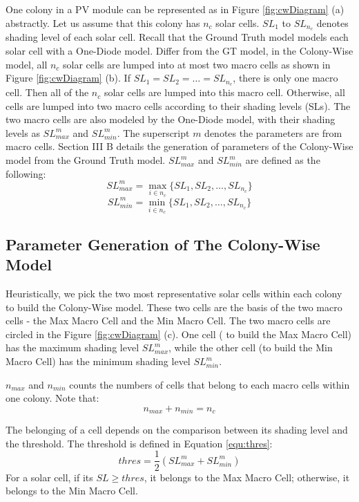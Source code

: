 One colony in a PV module can be represented as in Figure \ref{fig:cwDiagram} (a) abstractly. Let us assume that this colony has $n_c$ solar cells. $SL_1$ to $SL_{n_c}$ denotes shading level of each solar cell. Recall that the Ground Truth model models each solar cell with a One-Diode model. Differ from the GT model, in the Colony-Wise model, all $n_c$ solar cells are lumped into at most two macro cells as shown in Figure \ref{fig:cwDiagram} (b). If $SL_1 = SL_2 = \dots = SL_{n_c}$, there is only one macro cell. Then all of the $n_c$ solar cells are lumped into this macro cell. Otherwise, all cells are lumped into two macro cells according to their shading levels (SLs). The two macro cells are also modeled by the One-Diode model, with their shading levels as $SL_{max}^m$ and $SL_{min}^m$. The superscript $m$ denotes the parameters are from macro cells. Section III B details the generation of parameters of the Colony-Wise model from the Ground Truth model. $SL_{max}^m$ and $SL_{min}^m$ are defined as the following:
\begin{equation}\label{equ:slMax}
  SL_{max}^m = \max_{i \in n_c}{\{SL_1, SL_2,  \dots, SL_{n_c} \}}
\end{equation}
\begin{equation}\label{equ:slMin}
  SL_{min}^m = \min_{i \in n_c}{\{SL_1, SL_2,  \dots, SL_{n_c} \}}
\end{equation}

\subsection{Parameter Generation of The Colony-Wise Model}
Heuristically, we pick the two most representative solar cells within each colony to build the Colony-Wise model. These two cells are the basis of the two macro cells - the Max Macro Cell and the Min Macro Cell. The two macro cells are circled in the Figure \ref{fig:cwDiagram} (c). One cell ( to build the Max Macro Cell) has the maximum shading level $SL_{max}^m$, while the other cell (to build the Min Macro Cell) has the minimum shading level $SL_{min}^m$.

$n_{max}$ and $n_{min}$  counts the numbers of cells that belong to each macro cells within one colony. Note that:
\begin{equation}\label{equ:minMaxEqu}
  n_{max} + n_{min} = n_c
\end{equation}

The belonging of a cell depends on the comparison between its shading level and the threshold. The threshold is defined in Equation \ref{equ:thres}:
\begin{equation}\label{equ:thres}
  thres = \frac{1}{2}(SL_{max}^m+ SL_{min}^m )
\end{equation}
For a solar cell, if its $SL \ge thres$, it belongs to the Max Macro Cell; otherwise, it belongs to the Min Macro Cell.

